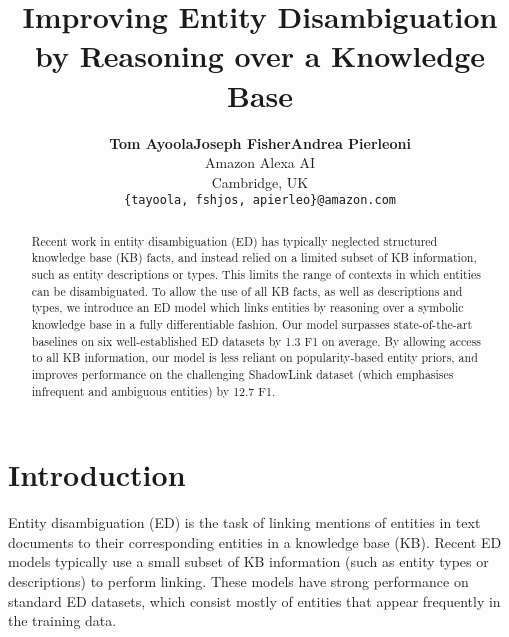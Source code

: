 \documentclass[11pt]{article}
\title{Improving Entity Disambiguation by Reasoning over a Knowledge Base}
\author{\centering\begin{tabular}{P{50mm}P{50mm}P{50mm}}
{\textbf{Tom Ayoola}} & {\textbf{Joseph Fisher}} & \textbf{Andrea Pierleoni} \\
       \multicolumn{3}{c}{\textnormal{Amazon Alexa AI}}                                     \\
       \multicolumn{3}{c}{\textnormal{Cambridge, UK}}                                        \\
       \multicolumn{3}{c}{\textnormal{\texttt{\{tayoola, fshjos, apierleo\}@amazon.com}}}   
    \end{tabular}}
\begin{document}
\maketitle
\renewcommand*{\thefootnote}{\fnsymbol{footnote}}
\renewcommand*{\thefootnote}{\arabic{footnote}}
\begin{abstract}







Recent work in entity disambiguation (ED) has typically neglected structured knowledge base (KB) facts, and instead relied on a limited subset of KB information, such as entity descriptions or types.
This limits the range of contexts in which entities can be disambiguated.
To allow the use of all KB facts, as well as descriptions and types, we introduce an ED model which links entities by reasoning over a symbolic knowledge base in a fully differentiable fashion. Our model surpasses state-of-the-art baselines on six well-established ED datasets by 1.3 F1 on average. By allowing access to all KB information, our model is less reliant on popularity-based entity priors, and improves performance on the challenging ShadowLink dataset (which emphasises infrequent and ambiguous entities) by 12.7 F1.





\end{abstract}

\section{Introduction}

Entity disambiguation (ED) is the task of linking mentions of entities in text documents to their corresponding entities in a knowledge base (KB). Recent ED models typically use a small subset of KB information (such as entity types or descriptions) to perform linking. These models have strong performance on standard ED datasets, which consist mostly of entities that appear frequently in the training data.
\end{document}
